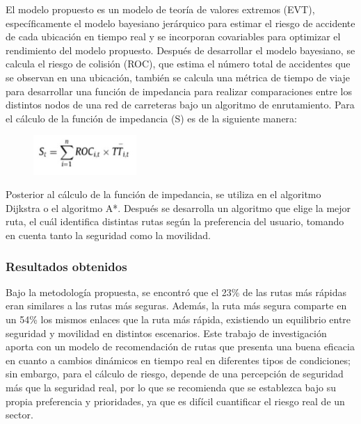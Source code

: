 El modelo propuesto es un modelo de teoría de valores extremos (EVT), específicamente el modelo bayesiano jerárquico para estimar el riesgo de accidente de cada ubicación en tiempo real y se incorporan covariables para optimizar el rendimiento del modelo propuesto. Después de desarrollar el modelo bayesiano, se calcula el riesgo de colisión (ROC), que estima el número total de accidentes que se observan en una ubicación, también se calcula una métrica de tiempo de viaje para desarrollar una función de impedancia para realizar comparaciones entre los distintos nodos de una red de carreteras bajo un algoritmo de enrutamiento. Para el cálculo de la función de impedancia (S) es de la siguiente manera:

\begin{figure}[h]
	\begin{center}
		\includegraphics[width=0.35\textwidth]{2/figures/roc.jpg}
	\end{center}
\end{figure}

Posterior al cálculo de la función de impedancia, se utiliza en el algoritmo Dijkstra o el algoritmo A*. Después se desarrolla un algoritmo que elige la mejor ruta, el cuál identifica distintas rutas según la preferencia del usuario, tomando en cuenta tanto la seguridad como la movilidad.

\subsubsection{Resultados obtenidos}
Bajo la metodología propuesta, se encontró que el 23\% de las rutas más rápidas eran similares a las rutas más seguras. Además, la ruta más segura comparte en un 54\% los mismos enlaces que la ruta más rápida, existiendo un equilibrio entre seguridad y movilidad en distintos escenarios. Este trabajo de investigación aporta con un modelo de recomendación de rutas que presenta una buena eficacia en cuanto a cambios dinámicos en tiempo real en diferentes tipos de condiciones; sin embargo, para el cálculo de riesgo, depende de una percepción de seguridad más que la seguridad real, por lo que se recomienda que se establezca bajo su propia preferencia y prioridades, ya que es difícil cuantificar el riesgo real de un sector.


